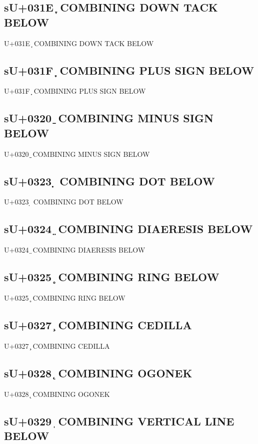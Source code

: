 \subsection{sU+031E ̞ COMBINING DOWN TACK BELOW}

U+031E ̞ COMBINING DOWN TACK BELOW

\subsection{sU+031F ̟ COMBINING PLUS SIGN BELOW}

U+031F ̟ COMBINING PLUS SIGN BELOW

\subsection{sU+0320 ̠ COMBINING MINUS SIGN BELOW}

U+0320 ̠ COMBINING MINUS SIGN BELOW

\subsection{sU+0323 ̣ COMBINING DOT BELOW}

U+0323 ̣ COMBINING DOT BELOW

\subsection{sU+0324 ̤ COMBINING DIAERESIS BELOW}

U+0324 ̤ COMBINING DIAERESIS BELOW

\subsection{sU+0325 ̥ COMBINING RING BELOW}

U+0325 ̥ COMBINING RING BELOW

\subsection{sU+0327 ̧ COMBINING CEDILLA}

U+0327 ̧ COMBINING CEDILLA

\subsection{sU+0328 ̨ COMBINING OGONEK}

U+0328 ̨ COMBINING OGONEK

\subsection{sU+0329 ̩ COMBINING VERTICAL LINE BELOW}

